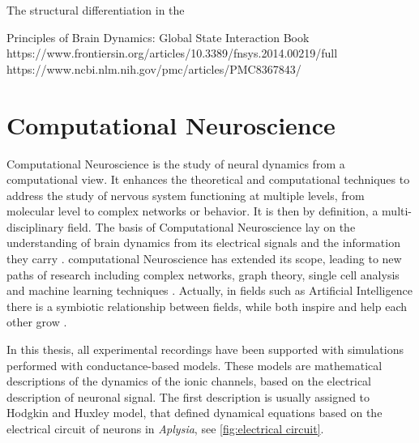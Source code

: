 The structural differentiation in the 




Principles of Brain Dynamics: Global State Interaction Book
https://www.frontiersin.org/articles/10.3389/fnsys.2014.00219/full
https://www.ncbi.nlm.nih.gov/pmc/articles/PMC8367843/


\section{Computational Neuroscience}
Computational Neuroscience is the study of neural dynamics from a computational view. It enhances the theoretical and computational techniques to address the study of nervous system functioning at multiple levels, from molecular 
level to complex networks or behavior. It is then by definition, a multi-disciplinary field. The basis of Computational Neuroscience lay on the understanding of brain dynamics from its electrical signals and the information they carry \cite{schwiening_brief_2012,catterall_hodgkin-huxley_2012,dimitrov_information_2011,shannon_mathematical_1948}. computational Neuroscience has extended its scope, leading to new paths of research including complex networks, graph theory, single cell analysis and machine learning techniques \cite{cns2023}. Actually, in fields such as Artificial Intelligence there is a symbiotic relationship between fields, while both inspire and help each other grow \cite{wozniak_deep_2020,goncalves_training_2020}.

In this thesis, all experimental recordings have been supported with simulations performed with conductance-based models. These models are mathematical descriptions of the dynamics of the ionic channels, based on the electrical description of neuronal signal. The first description is usually assigned to Hodgkin and Huxley model, that defined dynamical equations based on the electrical circuit of neurons in \textit{Aplysia}, see \ref{fig:electrical circuit}.

